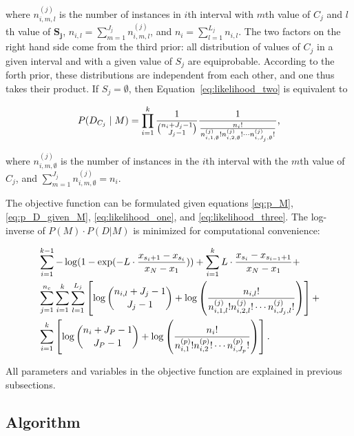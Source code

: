 \noindent
where $n^{(j)}_{i,m,l}$ is the number of instances in $i$th interval with $m$th value of $C_j$ and $l$th value of $\boldsymbol{S_j}$, $n_{i,l} = \sum_{m=1}^{J_j} n^{(j)}_{i,m,l}$, and $n_i = \sum_{l=1}^{L_j} n_{i,l}$.
The two factors on the right hand side come from the third prior: all distribution of values of $C_j$ in a given interval and with a given value of $S_j$ are equiprobable. According to the forth prior, these distributions are independent from each other, and one thus takes their product. If $S_j = \emptyset$, then Equation~\ref{eq:likelihood_two} is equivalent to

\begin{equation}
\label{eq:likelihood_three}
P(D_{C_j}  \mid M) =
\prod_{i=1}^{k}  {{1}\over{{n_{i} + J_j - 1}\choose{J_j-1}}}
{{1}\over{ {{n_{i}}!}\over{ {n^{(j)}_{i,1,\emptyset} !} {n^{(j)}_{i,2,\emptyset} !} \cdots {n^{(j)}_{i,J_j,\emptyset} !}}  }}\text{,}
\end{equation}

\noindent
where $n^{(j)}_{i,m,\emptyset}$ is the number of instances in the $i$th interval with the $m$th value of $C_j$, and $\sum_{m=1}^{J_j} n^{(j)}_{i,m,\emptyset} = n_i$.

The objective function can be formulated given equations \ref{eq:p_M}, \ref{eq:p_D_given_M}, \ref{eq:likelihood_one}, and \ref{eq:likelihood_three}.
The log-inverse of $P(M) \cdot P(D|M)$ is minimized for computational convenience:

\begin{equation}
\label{eq:opt_prob}
\begin{aligned}
& \sum_{i=1}^{k-1} - \log(1 - {\exp(- L \cdot {{x_{s_i+1} - x_{s_i}}\over{x_N - x_1}})}) +  \sum_{i=1}^{k} L \cdot {{x_{s_{i}} - x_{s_{i-1} + 1}}\over{x_N - x_1}} +\\
&  \sum_{j=1}^{n_c} \sum_{i=1}^{k}  \sum_{l=1}^{L_j} \left[  \log{{n_{i,l} + J_j - 1}\choose{J_j-1}} + \log \left( { {{n_{i,l}}!}\over{ {n^{(j)}_{i,1,l} !} {n^{(j)}_{i,2,l} !} \cdots {n^{(j)}_{i,J_j,l} !}} } \right) \right] + \\
& \sum_{i=1}^k \left[  \log {{n_{i} + J_P - 1}\choose{J_P-1}} + \log \left( { {{n_i}!}\over{ {n^{(p)}_{i,1} !} {n^{(p)}_{i,2} !} \cdots {n^{(p)}_{i,J_p} !}} } \right) \right]\text{.}
\end{aligned}
\end{equation}

All parameters and variables in the objective function are explained in previous subsections.

\subsection{Algorithm}

